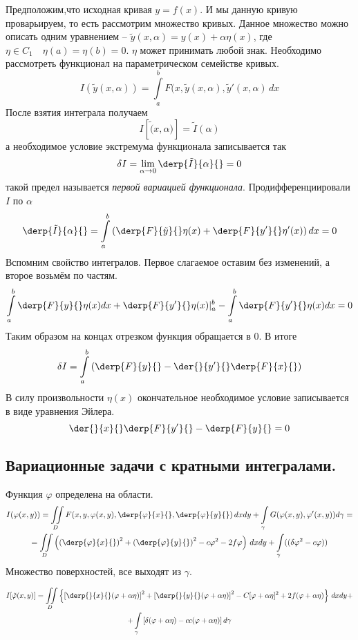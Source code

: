 Предположим,что исходная кривая $y = f(x)$. И мы данную кривую проварьируем, то есть рассмотрим множество кривых. Данное множество можно описать одним уравнением -- $\tilde y (x, \alpha) = y(x) + \alpha \eta (x)$, где $\eta \in C_1 \quad \eta(a) = \eta(b) = 0$. $\eta$ может принимать любой знак. Необходимо рассмотреть функционал на параметрическом семействе кривых.
\[
	I(\tilde y(x, \alpha)) = \int\limits_a^b F(x, \tilde y (x, \alpha), \tilde y' (x, \alpha)\, dx
\]
После взятия интеграла получаем
\[
	I[\tilde (x, \alpha)] = \tilde I( \alpha)
\]
а необходимое условие экстремума функционала записывается так
\begin{equation} \delta I = \lim\limits_{\alpha \to 0} \derp{\tilde I}{\alpha}{} = 0 \label{}\end{equation}
такой предел называется \textit{первой вариацией функционала}.
Продифференциировали $I$ по $\alpha$\\
\[
	\derp{\tilde I}{\alpha}{} = \int\limits_a^b \left(\derp{F}{\tilde y}{}  \eta (x) + \derp{F}{y'}{} \eta'(x) \right) dx = 0
\]
Вспомним свойство интегралов. Первое слагаемое оставим без изменений, а второе возьмём по частям.
\[
	\int\limits_a^b \derp{F}{y}{} \eta(x) dx + \derp{F}{y'}{} \eta(x) |_a^b - \int\limits_a^b \derp{F}{y'}{} \eta (x) dx = 0
\]
Таким образом на концах отрезком функция обращается в 0.
В итоге
\[
	\delta I = \int\limits_a^b \left(\derp{F}{y}{} - \der{}{y'}{} \derp{F}{x}{} \right)
\]
В силу произвольности $\eta(x)$ окончательное необходимое условие записывается в виде уравнения Эйлера. 
\[
	\der{}{x}{} \derp{F}{y'}{} - \derp{F}{y}{} = 0
\]
\subsection{Вариационные задачи с кратными интегралами.}

Функция $\varphi$ определена на области.
\begin{multline*}
	I(\varphi(x, y)) = \iint\limits_D F(x, y, \varphi(x, y), \derp{\varphi}{x}{}, \derp{\varphi}{y}{})\, dx dy + \int\limits_\gamma G(\varphi (x, y), \varphi' (x, y)) d \gamma =\\= \iint\limits_D \left( \left(\derp{\varphi}{x}{} \right)^2 + \left(\derp{\varphi}{y}{} \right)^2 - c \varphi^2 - 2 f \varphi \right)\, dx dy + \int\limits_\gamma ((\delta \varphi^2 - c \varphi))
\end{multline*}
Множество поверхностей, все выходят из $\gamma$.

\begin{multline*}
	I [ \tilde \varphi (x, y)] = \iint\limits_D \left\{ \left[ \derp{}{x}{} (\varphi + \alpha \eta)\right]^2 + \left[ \derp{}{y}{} (\varphi + \alpha \eta)\right]^2 - C [\varphi + \alpha \eta]^2 + 2 f (\varphi + \alpha \eta)\right\}\, dx dy +\\+ \int\limits_\gamma \left[ \delta (\varphi + \alpha \eta) - c c (\varphi + \alpha \eta)\right] d \gamma 
\end{multline*}


